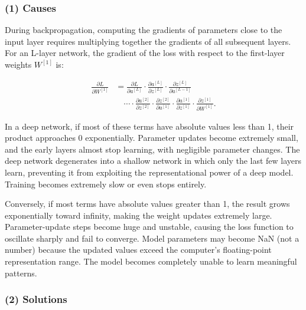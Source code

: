\hypertarget{causes}{%
\subsubsection{(1) Causes}\label{causes}}

During backpropagation, computing the gradients of parameters close to the input layer requires multiplying together the gradients of all subsequent layers. For an L-layer network, the gradient of the loss with respect to the first-layer weights \(W^{[1]}\) is:

\[
\begin{aligned}
\frac{\partial L}{\partial W^{[1]}}
&=
\frac{\partial L}{\partial a^{[L]}}
\cdot
\frac{\partial a^{[L]}}{\partial z^{[L]}}
\cdot
\frac{\partial z^{[L]}}{\partial a^{[L-1]}} \\
&\quad \cdots
\cdot
\frac{\partial a^{[2]}}{\partial z^{[2]}}
\cdot
\frac{\partial z^{[2]}}{\partial a^{[1]}}
\cdot
\frac{\partial a^{[1]}}{\partial z^{[1]}}
\cdot
\frac{\partial z^{[1]}}{\partial W^{[1]}} .
\end{aligned}
\]

In a deep network, if most of these terms have absolute values less than 1, their product approaches 0 exponentially. Parameter updates become extremely small, and the early layers almost stop learning, with negligible parameter changes. The deep network degenerates into a shallow network in which only the last few layers learn, preventing it from exploiting the representational power of a deep model. Training becomes extremely slow or even stops entirely.

Conversely, if most terms have absolute values greater than 1, the result grows exponentially toward infinity, making the weight updates extremely large. Parameter-update steps become huge and unstable, causing the loss function to oscillate sharply and fail to converge. Model parameters may become NaN (not a number) because the updated values exceed the computer's floating-point representation range. The model becomes completely unable to learn meaningful patterns.

\hypertarget{solutions}{%
\subsubsection{(2) Solutions}\label{solutions}}

